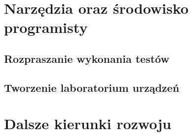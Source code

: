 \documentclass[a4paper]{article}
\begin{document}
\section{Narzędzia oraz środowisko programisty}

\subsection{Rozpraszanie wykonania testów}

\subsection{Tworzenie laboratorium urządzeń}

\section{Dalsze kierunki rozwoju}
\end{document}

